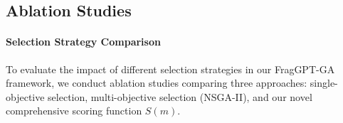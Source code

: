 \documentclass[lettersize,journal]{IEEEtran}
\begin{document}
\subsection{Ablation Studies}
\paragraph{Selection Strategy Comparison}
To evaluate the impact of different selection strategies in our FragGPT-GA framework, we conduct ablation studies comparing three approaches: single-objective selection, multi-objective selection (NSGA-II\cite{deb2002fast}), and our novel comprehensive scoring function $S(m)$. 
\end{document}
